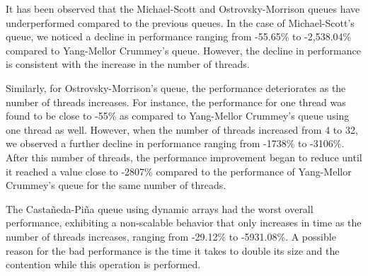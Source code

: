 %


It has been observed that the Michael-Scott and Ostrovsky-Morrison queues have underperformed compared to the previous queues. In the case of Michael-Scott's queue, we noticed a decline in performance ranging from -55.65\% to -2,538.04\% compared to Yang-Mellor Crummey's queue. However, the decline in performance is consistent with the increase in the number of threads.

Similarly, for Ostrovsky-Morrison's queue, the performance deteriorates as the number of threads increases. For instance, the performance for one thread was found to be close to -55\% as compared to Yang-Mellor Crummey's queue using one thread as well. However, when the number of threads increased from 4 to 32, we observed a further decline in performance ranging from -1738\% to -3106\%. After this number of threads, the performance improvement began to reduce until it reached a value close to -2807\% compared to the performance of Yang-Mellor Crummey's queue for the same number of threads.

The Castañeda-Piña queue using dynamic arrays had the worst overall performance, exhibiting a non-scalable behavior that only increases in time as the number of threads increases, ranging from -29.12\% to -5931.08\%. A possible reason for the bad performance is the time it takes to double its size and the contention while this operation is performed.

